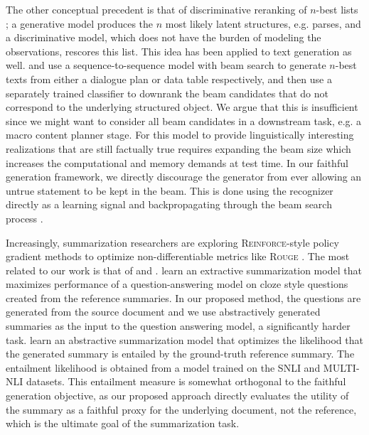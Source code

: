 The other conceptual precedent is that of discriminative reranking 
of $n$-best lists \cite{collins2005discriminative,charniak2005coarse};
a generative model produces the $n$ most likely latent structures, e.g. parses,
and a discriminative model, which does not have the burden of modeling
the observations, rescores this list.  This idea has been applied 
to text generation as well. \cite{wen2015stochastic} and 
\cite{novikova2017e2e} use a 
sequence-to-sequence
model with beam search to generate $n$-best texts from either a 
dialogue plan or data table respectively,
 and then use a separately trained
classifier to downrank the beam candidates that do not correspond to the 
underlying
structured object.
We argue that this is insufficient since we might want to consider 
all beam candidates in a downstream task, e.g. a macro content planner stage.
For this model to provide linguistically interesting realizations that are 
still
factually true requires expanding the beam size 
which increases the computational and memory demands at test time. 
In our faithful generation framework, we directly discourage the generator from
ever allowing an untrue statement to be kept in the beam. This is done
using the recognizer directly as a learning signal and backpropagating
through the beam search process \cite{wiseman2016sequence}.

Increasingly, summarization researchers are exploring
 \textsc{Reinforce}-style
policy gradient methods to optimize non-differentiable metrics like 
\textsc{Rouge} \cite{paulus2017deep,arumae2018reinforced,kryscinski2018improving,narayan2018ranking,pasunuru2018multi}.
The most related to our work is that of \cite{arumae2018reinforced} 
and \cite{pasunuru2018multi}.
\cite{arumae2018reinforced} 
learn an extractive summarization model that maximizes
performance of a question-answering model on cloze style questions created
from the reference summaries. In our proposed method, the questions are 
generated from the source document and we use abstractively generated 
summaries as
the input to the question answering model, a significantly harder task.
\cite{pasunuru2018multi} learn an abstractive summarization model that
optimizes the likelihood that the generated summary is entailed by the 
ground-truth reference summary. The entailment likelihood is obtained from a
model trained on the SNLI \cite{bowman2015large} and MULTI-NLI 
\cite{williams2018broad} datasets.
This entailment measure is somewhat orthogonal to the faithful generation 
objective, as our proposed
approach directly evaluates the utility of the summary as a faithful proxy
for the underlying document, not the reference, which is the ultimate goal of the 
summarization task.


